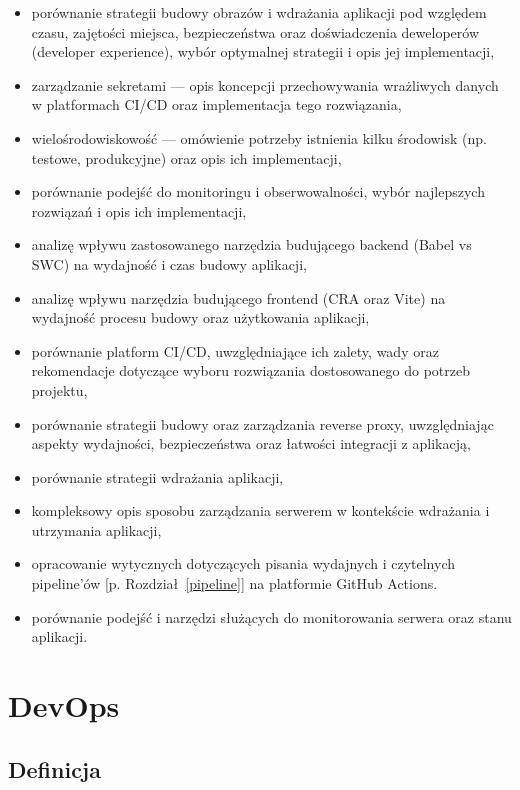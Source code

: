\documentclass{article}
\newcommand{\chapref}[1]{[p. Rozdział~\ref{#1}]}
\begin{document}
\begin{itemize}
    \item porównanie strategii budowy obrazów i wdrażania aplikacji pod względem czasu, zajętości miejsca, bezpieczeństwa oraz doświadczenia deweloperów (developer experience), wybór optymalnej strategii i opis jej implementacji,
    \item zarządzanie sekretami — opis koncepcji przechowywania wrażliwych danych w platformach CI/CD oraz implementacja tego rozwiązania,
    \item wielośrodowiskowość — omówienie potrzeby istnienia kilku środowisk (np. testowe, produkcyjne) oraz opis ich implementacji,
    \item porównanie podejść do monitoringu i obserwowalności, wybór najlepszych rozwiązań i opis ich implementacji,
    \item analizę wpływu zastosowanego narzędzia budującego backend (Babel vs SWC) na wydajność i czas budowy aplikacji,
    \item analizę wpływu narzędzia budującego frontend (CRA oraz Vite) na wydajność procesu budowy oraz użytkowania aplikacji,
    \item porównanie platform CI/CD, uwzględniające ich zalety, wady oraz rekomendacje dotyczące wyboru rozwiązania dostosowanego do potrzeb projektu,
    \item porównanie strategii budowy oraz zarządzania reverse proxy, uwzględniając aspekty wydajności, bezpieczeństwa oraz łatwości integracji z aplikacją,
    \item porównanie strategii wdrażania aplikacji,
    \item kompleksowy opis sposobu zarządzania serwerem w kontekście wdrażania i utrzymania aplikacji,
    \item opracowanie wytycznych dotyczących pisania wydajnych i czytelnych pipeline’ów \chapref{pipeline} na platformie GitHub Actions.
    \item porównanie podejść i narzędzi służących do monitorowania serwera oraz stanu aplikacji.
\end{itemize}

\section {DevOps}

\subsection{Definicja}
\end{document}
